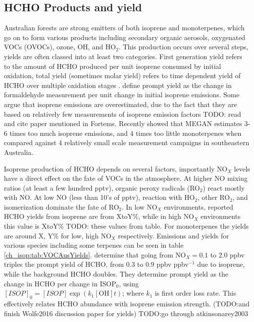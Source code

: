   \subsection{HCHO Products and yield}
    Australian forests are strong emitters of both isoprene and monoterpenes, which go on to form various products including secondary organic aerosols, oxygenated VOCs (OVOCs), ozone, OH, and HO$_2$.
    This production occurs over several steps, yields are often classed into at least two categories.
    First generation yield refers to the amount of HCHO produced per unit isoprene consumed by initial oxidation, total yield (sometimes molar yield) refers to time dependent yield of HCHO over multiple oxidation stages \citep{Wolfe2016}.
    \citet{Wolfe2016} define prompt yield as the change in formaldehyde measurement per unit change in initial isoprene emissions.
    Some argue that isoprene emissions are overestimated, due to the fact that they are based on relatively few measurements of isoprene emission factors \citep{Winters2009, FortemsCheiney2012} TODO: read and cite paper mentioned in Fortems.
    Recently \cite{Emmersen2017} showed that MEGAN estimates 3-6 times too much isoprene emissions, and 4 times too little monoterpenes when compared against 4 relatively small scale measurement campaigns in southeastern Australia.
    
    Isoprene production of HCHO depends on several factors, importantly NO$_X$ levels have a direct effect on the fate of VOCs in the atmosphere.
    At higher NO mixing ratios (at least a few hundred pptv), organic peroxy radicals (RO$_2$) react mostly with NO. 
    At low NO (less than 10's of pptv), reaction with HO$_2$, other RO$_2$, and isomerization dominate the fate of RO$_2$.
    In low NO$_X$ environments, reported HCHO yields from isoprene are from XtoY\%, while in high NO$_X$ environments this value is XtoY\% TODO: these values from table.
    For monoterpenes the yields are around X, Y\% for low, high NO$_X$ respectively.
    Emissions and yields for various species including some terpenes can be seen in table \ref{ch_isop:tab:VOCAusYields}.
    \citet{Wolfe2016} determine that going from NO$_X = 0.1$ to $2.0$ ppbv triples the prompt yield of HCHO, from 0.3 to 0.9 ppbv ppbv$^{-1}$ due to isoprene, while the background HCHO doubles.
    They determine prompt yield as the change in HCHO per change in ISOP$_0$, using $[ISOP]_0=[ISOP]\exp(k_1[\mathrm{OH}]t)$; where $k_1$ is first order loss rate.
    This effectively relates HCHO abundance with isoprene emission strength.
    (TODO:and finish Wolfe2016 discussion paper for yields)
    TODO:go through atkinsonarey2003
    
